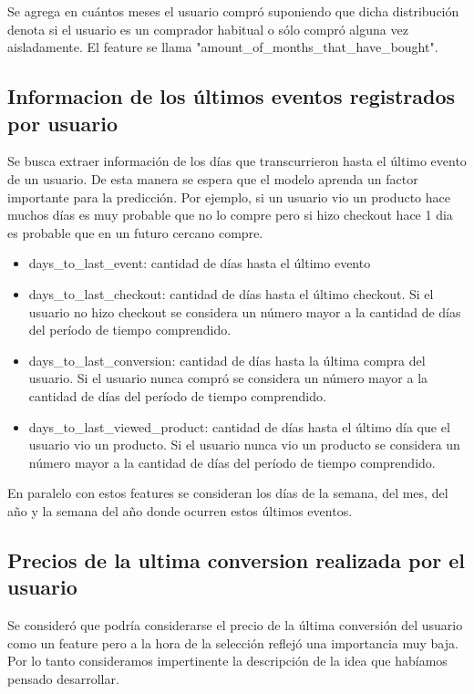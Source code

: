 \documentclass[a4paper]{article}
\begin{document}
Se agrega en cuántos meses el usuario compró suponiendo que dicha distribución denota si el usuario es un comprador habitual o sólo compró alguna vez aisladamente. El feature se llama "amount\_of\_months\_that\_have\_bought".

\subsection{Informacion de los últimos eventos registrados por usuario}

Se busca extraer información de los días que transcurrieron hasta el último evento de un usuario. De esta manera se espera que el modelo aprenda un factor importante para la predicción. Por ejemplo, si un usuario vio un producto hace muchos días es muy probable que no lo compre pero si hizo checkout hace 1 dia es probable que en un futuro cercano compre.

\begin{itemize}
	\item days\_to\_last\_event: cantidad de días hasta el último evento
	\item days\_to\_last\_checkout: cantidad de días hasta el último checkout. Si el usuario no hizo checkout se considera un número mayor a la cantidad de días del período de tiempo comprendido.
	\item days\_to\_last\_conversion: cantidad de días hasta la última compra del usuario. Si el usuario nunca compró se considera un número mayor a la cantidad de días del período de tiempo comprendido.
	\item days\_to\_last\_viewed\_product: cantidad de días hasta el último día que el usuario vio un producto. Si el usuario nunca vio un producto se considera un número mayor a la cantidad de días del período de tiempo comprendido.
\end{itemize}
	
En paralelo con estos features se consideran los días de la semana, del mes, del año y la semana del año donde ocurren estos últimos eventos.	
	
\subsection{Precios de la ultima conversion realizada por el usuario}

Se consideró que podría considerarse el precio de la última conversión del usuario como un feature pero a la hora de la selección reflejó una importancia muy baja. Por lo tanto consideramos impertinente la descripción de la idea que habíamos pensado desarrollar.
\end{document}
